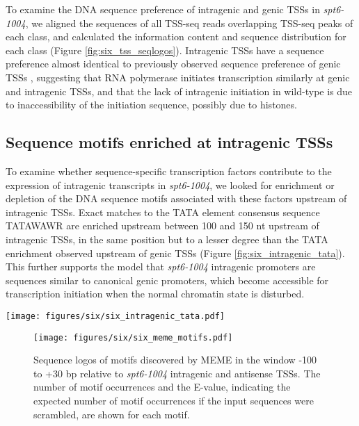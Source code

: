 To examine the DNA sequence preference of intragenic and genic TSSs in \textit{spt6-1004}, we aligned the sequences of all TSS-seq reads overlapping TSS-seq peaks of each class, and calculated the information content and sequence distribution for each class (Figure \ref{fig:six_tss_seqlogos}).
Intragenic TSSs have a sequence preference almost identical to previously observed sequence preference of genic TSSs \citep{malabat2015}, suggesting that RNA polymerase initiates transcription similarly at genic and intragenic TSSs, and that the lack of intragenic initiation in wild-type is due to inaccessibility of the initiation sequence, possibly due to histones.

\subsection{Sequence motifs enriched at intragenic TSSs}

To examine whether sequence-specific transcription factors contribute to the expression of intragenic transcripts in \textit{spt6-1004}, we looked for enrichment or depletion of the DNA sequence motifs associated with these factors upstream of intragenic TSSs.
Exact matches to the TATA element consensus sequence TATAWAWR are enriched upstream between 100 and 150 nt upstream of intragenic TSSs, in the same position but to a lesser degree than the TATA enrichment observed upstream of genic TSSs (Figure \ref{fig:six_intragenic_tata}).
This further supports the model that \textit{spt6-1004} intragenic promoters are sequences similar to canonical genic promoters, which become accessible for transcription initiation when the normal chromatin state is disturbed.

\begin{SCfigure}[50][h]
    \centering
    \texttt{[image: figures/six/six\_intragenic\_tata.pdf]}
    \caption[Kernel density estimate of matches to a consensus TATA-box motif upstream of genic and \textit{spt6-1004}-induced intragenic TSSs.]{Scaled density of occurrences of exact matches to the motif TATAWAWR upstream of TSSs. For each category, a Gaussian kernel density estimate of the positions of motif occurrences is scaled by the number of motif occurrences per region.}
    \label{fig:six_intragenic_tata}
\end{SCfigure}

\begin{figure}[h]
    \centering
    \texttt{[image: figures/six/six\_meme\_motifs.pdf]}
    \caption[Sequence logos of motifs discovered by MEME upstream of \textit{spt6-1004}-induced intragenic and antisense TSSs.]{Sequence logos of motifs discovered by MEME \citep{bailey2015} in the window -100 to +30 bp relative to \textit{spt6-1004} intragenic and antisense TSSs. The number of motif occurrences and the E-value, indicating the expected number of motif occurrences if the input sequences were scrambled, are shown for each motif.}
    \label{fig:six_meme_motifs}
\end{figure}

